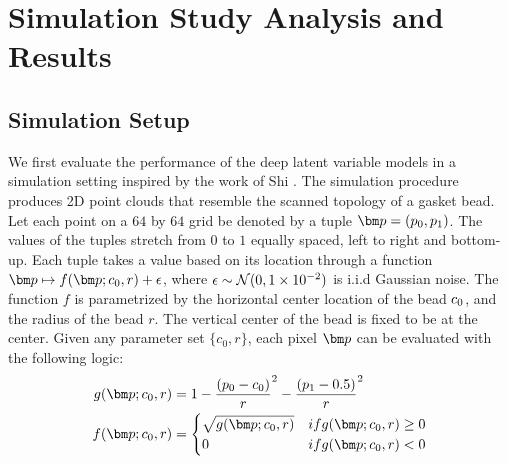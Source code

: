 \documentclass[journal, peerreview]{IEEEtran}
\begin{document}
\section{Simulation Study Analysis and Results}
\subsection{Simulation Setup}\label{sec:simsetting}
We first evaluate the performance of the deep latent variable models in a simulation setting inspired by the work of Shi \etal \cite{Shi2016-tg}. The simulation procedure produces 2D point clouds that resemble the scanned topology of a gasket bead.
Let each point on a $64$ by $64$ grid be denoted by a tuple $\mbp = (p_0, p_1)$.
The values of the tuples stretch from $0$ to $1$ equally spaced, left to right and bottom-up.
Each tuple takes a value based on its location through a function $\mbp \mapsto f(\mbp; \czero, r) + \epsilon$, where $\epsilon \sim \mathcal{N}(0, 1\times10^{-2})$ is i.i.d Gaussian noise.
The function $f$ is parametrized by the horizontal center location  of the bead $ c_{0} $, and the radius of the bead $r$.
The vertical center of the bead is fixed to be at the center.
Given any parameter set $\{c_0,r\}$, each pixel $\mbp$ can be evaluated with the following logic:
\begin{equation}
\label{eq:gasketfun}
\begin{split}
g(\mbp; c_0,r)&=1-\frac{(p_0 - \czero)}{r}^2 - \frac{(p_1 - 0.5)}{r}^2 \\
	f(\mbp; c_0,r)&= 
	 \begin{cases} 
	 \sqrt{g(\mbp; c_0,r)} &\mbox{if } g(\mbp; c_0,r) \geq 0 \\ 
 0 & \mbox{if } g(\mbp; c_0,r)<0 
	\end{cases}
\end{split}
\end{equation}
\end{document}
